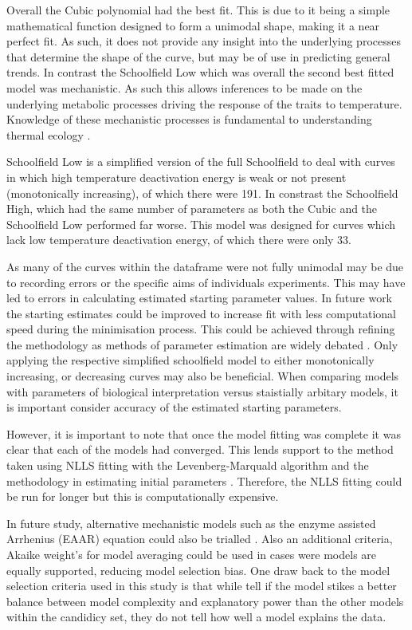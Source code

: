 \documentclass[11pt]{article}
\begin{document}
	Overall the Cubic polynomial had the best fit.	This is due to it being a simple mathematical function designed to form a unimodal shape, making it a near perfect fit. As such, it does not provide any insight into the underlying processes that determine the shape of the curve, but may be of use in predicting general trends. In contrast the Schoolfield Low which was overall the second best fitted model was mechanistic. As such this allows inferences to be made on the underlying metabolic processes driving the response of the traits to temperature. Knowledge of these mechanistic processes is fundamental to understanding thermal ecology \citep{delong2017combined}.
	
	Schoolfield Low is a simplified version of the full Schoolfield to deal with curves in which high temperature deactivation energy is weak or not present (monotonically increasing), of which there were 191. In constrast the Schoolfield High, which had the same number of parameters as both the Cubic and the Schoolfield Low performed far worse. This model was designed for curves which lack low temperature deactivation energy, of which there were only 33. 
	
	As many of the curves within the dataframe were not fully unimodal may be due to recording errors or the specific aims of individuals experiments. This may have led to errors in calculating estimated starting parameter values. In future work the starting estimates could be improved to increase fit with less computational speed during the minimisation process. This could be achieved through refining the methodology as methods of parameter estimation are widely debated \citep{slezak2010optimal}. Only applying the respective simplified schoolfield model to either monotonically increasing, or decreasing curves may also be beneficial. When comparing models with parameters of biological interpretation versus staistially arbitary models, it is important consider accuracy of the estimated starting parameters. 
	
	However, it is important to note that once the model fitting was complete it was clear that each of the models had converged. This lends support to the method taken using NLLS fitting with the Levenberg-Marquald algorithm and the methodology in estimating initial parameters \citep{newville2016lmfit}. Therefore, the NLLS fitting could be run for longer but this is computationally expensive. 
	
	In future study, alternative mechanistic models such as the enzyme assisted Arrhenius (EAAR) equation could also be trialled \citep{delong2017combined}. Also an additional criteria, Akaike weight's for model averaging could be used in cases were models are equally supported, reducing model selection bias. One draw back to the model selection criteria used in this study is that while tell if the model stikes a better balance between model complexity and explanatory power than the other models within the candidicy set, they do not tell how well a model explains the data. 
	
\end{document}
